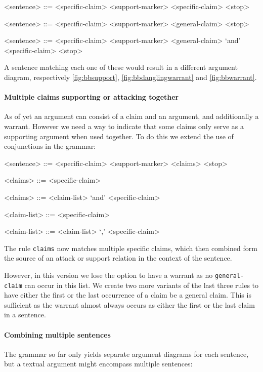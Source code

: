 \documentclass{IOS-Book-Article}
\begin{document}
\begin{grammar}

<sentence> ::= <specific-claim> <support-marker> <specific-claim> <stop>

<sentence> ::= <specific-claim> <support-marker> <general-claim> <stop>

<sentence> ::= <specific-claim> <support-marker> <general-claim> `and' <specific-claim> <stop>

\end{grammar}

\noindent A sentence matching each one of these would result in a different argument diagram, respectively \autoref{fig:bbsupport}, \autoref{fig:bbdanglingwarrant} and \autoref{fig:bbwarrant}.

\paragraph{Multiple claims supporting or attacking together} As of yet an argument can consist of a claim and an argument, and additionally a warrant. However we need a way to indicate that some claims only serve as a supporting argument when used together. To do this we extend the use of conjunctions in the grammar:

\begin{grammar}

<sentence> ::= <specific-claim> <support-marker> <claims> <stop>

<claims> ::= <specific-claim>

<claims> ::= <claim-list> `and' <specific-claim>

<claim-list> ::= <specific-claim>

<claim-list> ::= <claim-list> `,' <specific-claim>

\end{grammar}

The rule \texttt{claims} now matches multiple specific claims, which then combined form the source of an attack or support relation in the context of the sentence.

However, in this version we lose the option to have a warrant as no \texttt{general-claim} can occur in this list. We create two more variants of the last three rules to have either the first or the last occurrence of a claim be a general claim. This is sufficient as the warrant almost always occurs as either the first or the last claim in a sentence.

\paragraph{Combining multiple sentences} The grammar so far only yields separate argument diagrams for each sentence, but a textual argument might encompass multiple sentences:
\end{document}

